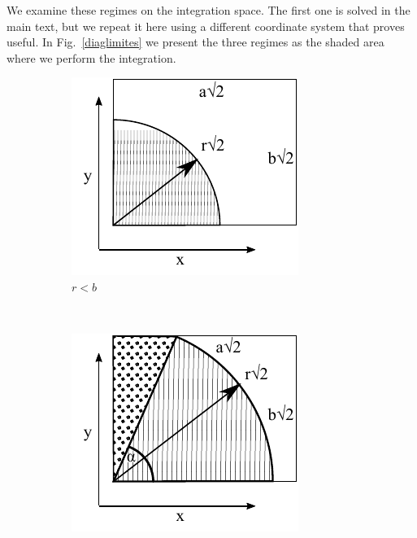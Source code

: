 \documentclass[superscriptaddress,pre,reprint,showpacs,twocolumn]{revtex4-1}
\begin{document}
We examine these regimes on the integration space. The first one is solved
in the main text, but we repeat it here using a different coordinate system
that proves useful. In Fig.~\ref{diaglimites} we present the three regimes as
the shaded area where we perform the integration. 
  
\begin{figure}[h]
        \centering
        \begin{subfigure}[b]{0.32\textwidth}
          \centering
          \includegraphics[width=\textwidth]{figures/DiagramaIntegraCaso1.pdf}
          \caption{$r<b$}
          \label{Caso1}
        \end{subfigure}%
        ~ %
        \begin{subfigure}[b]{0.32\textwidth}
          \centering
          \includegraphics[width=\textwidth]{figures/DiagramaIntegraCaso2.pdf}

\end{subfigure}
\end{figure}
\end{document}
